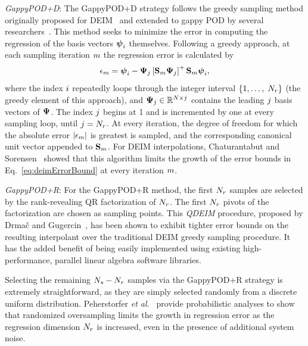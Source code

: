 \vspace{0.5cm}
\noindent \textit{GappyPOD+D}:
The GappyPOD+D strategy follows the greedy sampling method originally proposed for DEIM~\cite{Chaturantabut2010} and extended to gappy POD by several researchers~\cite{Zhou2012,Carlberg2013}. This method seeks to minimize the error in computing the regression of the basis vectors $\boldsymbol{\psi}_{i}$ themselves. Following a greedy approach, at each sampling iteration $m$ the regression error is calculated by
%
\begin{equation}
    \errVec_{\greedyIdx} = \deimBasisVec_{\dummyIdx} - \deimBasis_{\dummyIdxTwo} \left[ \sampMat_{\greedyIdx} \deimBasis_{\dummyIdxTwo} \right]^+ \sampMat_{\greedyIdx}\deimBasisVec_{\dummyIdx},
\end{equation}
%
where the index $i$ repeatedly loops through the integer interval $\{1, \hdots, \; N_r\}$ (the greedy element of this approach), and $\deimBasis_{\dummyIdxTwo} \inRTwo{\numDOF}{\dummyIdxTwo}$ contains the leading $j$ basis vectors of $\deimBasis$. The index $j$ begins at 1 and is incremented by one at every sampling loop, until $j = N_r$. At every iteration, the degree of freedom for which the absolute error $|\epsilon_{m}|$ is greatest is sampled, and the corresponding canonical unit vector appended to $\mathbf{S}_{m}$. For DEIM interpolations, Chaturantabut and Sorensen~\cite{Chaturantabut2010} showed that this algorithm limits the growth of the error bounds in Eq.~\ref{eq:deimErrorBound} at every iteration $m$.

\vspace{0.5cm}
\noindent \textit{GappyPOD+R}:
For the GappyPOD+R method, the first $N_r$ samples are selected by the rank-revealing QR factorization of $N_r$. The first $N_r$ pivots of the factorization are chosen as sampling points. This \textit{QDEIM} procedure, proposed by Drma\v{c} and Gugercin~\cite{Drmac2016}, has been shown to exhibit tighter error bounds on the resulting interpolant over the traditional DEIM greedy sampling procedure. It has the added benefit of being easily implemented using existing high-performance, parallel linear algebra software libraries.

Selecting the remaining $N_s - N_r$ samples via the GappyPOD+R strategy is extremely straightforward, as they are simply selected randomly from a discrete uniform distribution. Peherstorfer \textit{et al.}~\cite{Peherstorfer2020} provide probabilistic analyses to show that randomized oversampling limits the growth in regression error as the regression dimension $N_r$ is increased, even in the presence of additional system noise.

